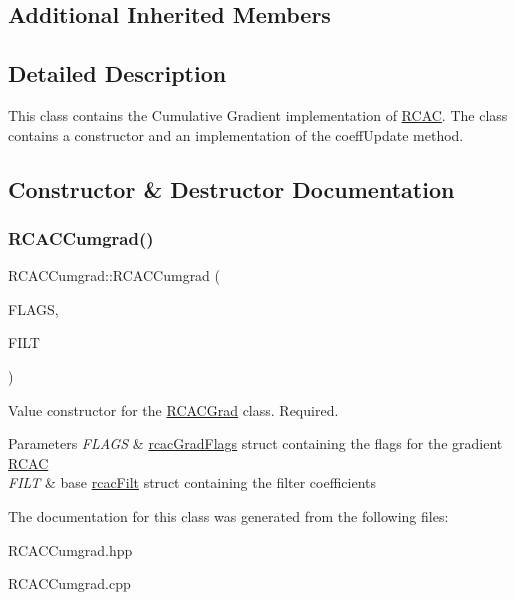 \subsection*{Additional Inherited Members}


\subsection{Detailed Description}
This class contains the Cumulative Gradient implementation of \hyperlink{class_r_c_a_c}{R\+C\+AC}. The class contains a constructor and an implementation of the coeff\+Update method. 

\subsection{Constructor \& Destructor Documentation}
\mbox{\label{class_r_c_a_c_cumgrad_af03fdcd5712a8ba9e9d29e10e6fe1afe}} 
\subsubsection{\texorpdfstring{R\+C\+A\+C\+Cumgrad()}{RCACCumgrad()}}
{\footnotesize\ttfamily R\+C\+A\+C\+Cumgrad\+::\+R\+C\+A\+C\+Cumgrad (\begin{DoxyParamCaption}\item[{\hyperlink{structrcac_cumgrad_flags}{rcac\+Cumgrad\+Flags} \&}]{F\+L\+A\+GS,  }\item[{\hyperlink{structrcac_filt}{rcac\+Filt} \&}]{F\+I\+LT }\end{DoxyParamCaption})}

Value constructor for the \hyperlink{class_r_c_a_c_grad}{R\+C\+A\+C\+Grad} class. Required.


\begin{DoxyParams}{Parameters}
{\em F\+L\+A\+GS} & \hyperlink{structrcac_grad_flags}{rcac\+Grad\+Flags} struct containing the flags for the gradient \hyperlink{class_r_c_a_c}{R\+C\+AC} \\
\hline
{\em F\+I\+LT} & base \hyperlink{structrcac_filt}{rcac\+Filt} struct containing the filter coefficients \\
\hline
\end{DoxyParams}


The documentation for this class was generated from the following files\+:\begin{DoxyCompactItemize}
\item 
R\+C\+A\+C\+Cumgrad.\+hpp\item 
R\+C\+A\+C\+Cumgrad.\+cpp\end{DoxyCompactItemize}

